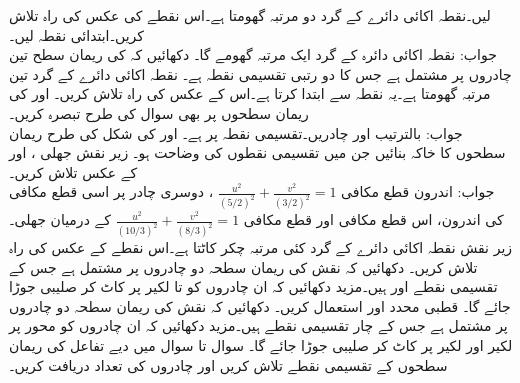 \quad
{} لیں۔نقطہ  اکائی دائرے کے گرد دو مرتبہ گھومتا ہے۔اس نقطے کی عکس کی راہ تلاش کریں۔ابتدائی نقطہ  لیں۔\\
جواب:\quad
نقطہ  اکائی دائرہ  کے گرد ایک مرتبہ گھومے گا۔
\quad
دکھائیں کہ  کی ریمان سطح تین چادروں پر مشتمل ہے جس کا دو رتبی تقسیمی نقطہ  ہے۔ نقطہ  اکائی دائرے کے گرد تین مرتبہ گھومتا ہے۔یہ نقطہ  سے ابتدا کرتا ہے۔اس کے عکس کی راہ تلاش کریں۔
\quad
{} اور  کی ریمان سطحوں  پر بھی سوال  کی طرح تبصرہ کریں۔\\
جواب:\quad
بالترتیب  اور  چادریں۔تقسیمی نقطہ  پر ہے۔
\quad
{} اور  کی شکل  کی طرح  ریمان سطحوں کا خاکہ بنائیں جن میں تقسیمی نقطوں کی وضاحت ہو۔
\quad
زیر نقش  جھلی ،  اور  کے عکس تلاش کریں۔\\
جواب:\quad
اندرون قطع مکافی 
$\tfrac{u^2}{(5/2)^2}+\tfrac{v^2}{(3/2)^2}=1$
، دوسری چادر پر اسی قطع مکافی کی اندرون، اس قطع مکافی اور قطع مکافی 
$\tfrac{u^2}{(10/3)^2}+\tfrac{v^2}{(8/3)^2}=1$
کے درمیان جھلی۔
\quad
زیر نقش  نقطہ  اکائی دائرے کے گرد کئی مرتبہ چکر کاٹتا ہے۔اس نقطے کے عکس کی راہ تلاش کریں۔
\quad
دکھائیں کہ نقش   کی ریمان سطحہ دو چادروں پر مشتمل ہے  جس  کے تقسیمی نقطے  اور  ہیں۔مزید دکھائیں کہ ان چادروں کو  تا  لکیر پر کاٹ کر صلیبی جوڑا جائے گا۔ قطبی محدد  اور  استعمال کریں۔
\quad
دکھائیں کہ نقش   کی ریمان سطحہ دو چادروں پر مشتمل ہے  جس  کے چار تقسیمی نقطے ہیں۔مزید دکھائیں کہ ان چادروں کو محور  پر لکیر     اور لکیر  پر کاٹ کر صلیبی جوڑا جائے گا۔
سوال  تا سوال  میں دیے تفاعل کی ریمان سطحوں  کے تقسیمی نقطے تلاش کریں اور چادروں کی تعداد دریافت کریں۔ 

